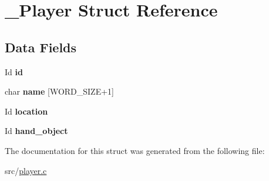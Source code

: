 \hypertarget{struct__Player}{}\section{\+\_\+\+Player Struct Reference}
\label{struct__Player}
\subsection*{Data Fields}
\begin{DoxyCompactItemize}
\item 
\mbox{\label{struct__Player_a60d635cd063816a9c1bd873f4868bb90}} 
Id {\bfseries id}
\item 
\mbox{\label{struct__Player_ac89715f913cc607b75eb7236765c41f5}} 
char {\bfseries name} \mbox{[}W\+O\+R\+D\+\_\+\+S\+I\+ZE+1\mbox{]}
\item 
\mbox{\label{struct__Player_adbb6195d15b88f3f658e74274eff52d8}} 
Id {\bfseries location}
\item 
\mbox{\label{struct__Player_a1d3b7bfde0c5815016b2f6fa2c9d63c7}} 
Id {\bfseries hand\+\_\+object}
\end{DoxyCompactItemize}


The documentation for this struct was generated from the following file\+:\begin{DoxyCompactItemize}
\item 
src/\hyperlink{player_8c}{player.\+c}\end{DoxyCompactItemize}
